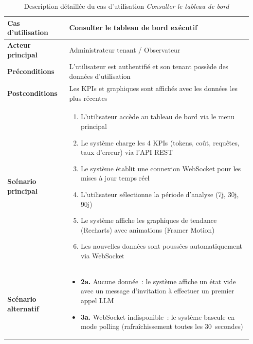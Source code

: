 \begin{table}[H]
\centering
\caption{Description détaillée du cas d'utilisation \textit{Consulter le tableau de bord}}
\label{tab:uc_desc_dashboard}
\begin{tabularx}{\textwidth}{|l|X|}
\hline
\textbf{Cas d'utilisation} & Consulter le tableau de bord exécutif \\
\hline
\textbf{Acteur principal} & Administrateur tenant / Observateur \\
\hline
\textbf{Préconditions} & L'utilisateur est authentifié et son tenant possède des données d'utilisation \\
\hline
\textbf{Postconditions} & Les KPIs et graphiques sont affichés avec les données les plus récentes \\
\hline
\textbf{Scénario principal} & \begin{minipage}[t]{\linewidth}\vspace{2pt}
\begin{enumerate}[noitemsep,topsep=0pt]
\item L'utilisateur accède au tableau de bord via le menu principal
\item Le système charge les 4 KPIs (tokens, coût, requêtes, taux d'erreur) via l'API REST
\item Le système établit une connexion WebSocket pour les mises à jour temps réel
\item L'utilisateur sélectionne la période d'analyse (7j, 30j, 90j)
\item Le système affiche les graphiques de tendance (Recharts) avec animations (Framer Motion)
\item Les nouvelles données sont poussées automatiquement via WebSocket
\end{enumerate}\vspace{2pt}
\end{minipage} \\
\hline
\textbf{Scénario alternatif} & \begin{minipage}[t]{\linewidth}\vspace{2pt}
\begin{itemize}[noitemsep,topsep=0pt]
\item \textbf{2a.} Aucune donnée~: le système affiche un état vide avec un message d'invitation à effectuer un premier appel LLM
\item \textbf{3a.} WebSocket indisponible~: le système bascule en mode polling (rafraîchissement toutes les 30~secondes)
\end{itemize}\vspace{2pt}
\end{minipage} \\
\hline
\end{tabularx}
\end{table}


